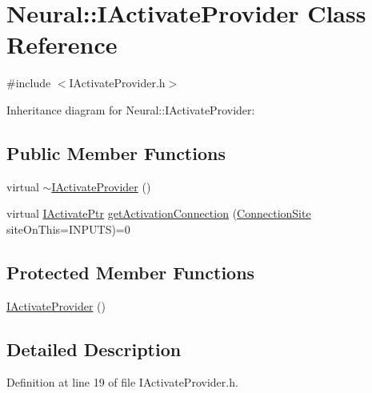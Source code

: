 \hypertarget{class_neural_1_1_i_activate_provider}{
\section{Neural::IActivateProvider Class Reference}
\label{class_neural_1_1_i_activate_provider}
}


{\ttfamily \#include $<$IActivateProvider.h$>$}



Inheritance diagram for Neural::IActivateProvider:
\subsection*{Public Member Functions}
\begin{DoxyCompactItemize}
\item 
virtual \hyperlink{class_neural_1_1_i_activate_provider_acff89daa3b49e8627f862d4e875833f2}{$\sim$IActivateProvider} ()
\item 
virtual \hyperlink{namespace_neural_aa317acf32f01510e99627087e14785c1}{IActivatePtr} \hyperlink{class_neural_1_1_i_activate_provider_a56b4e3db7afe333eae21213c67fe9f34}{getActivationConnection} (\hyperlink{namespace_neural_add871cb0324e8abfb693026afba3a621}{ConnectionSite} siteOnThis=INPUTS)=0
\end{DoxyCompactItemize}
\subsection*{Protected Member Functions}
\begin{DoxyCompactItemize}
\item 
\hyperlink{class_neural_1_1_i_activate_provider_a26e4ed551c37e4e042959b60ca573a48}{IActivateProvider} ()
\end{DoxyCompactItemize}


\subsection{Detailed Description}


Definition at line 19 of file IActivateProvider.h.



